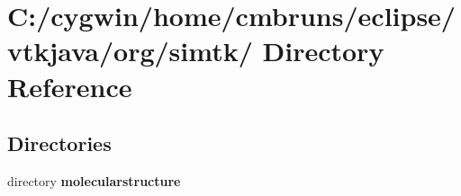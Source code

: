 \section{C:/cygwin/home/cmbruns/eclipse/vtkjava/org/simtk/ Directory Reference}
\label{dir_000006}
\subsection*{Directories}
\begin{CompactItemize}
\item 
directory {\bf molecularstructure}
\end{CompactItemize}
